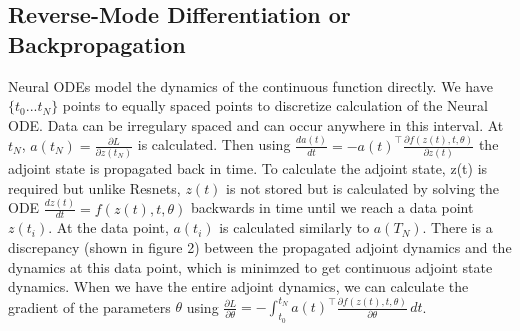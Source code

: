 \documentclass[12pt]{article}
\begin{document}
\subsection{Reverse-Mode Differentiation or Backpropagation} 
Neural ODEs model the dynamics of the continuous function directly. We have $\{t_{0} ... t_{N}\}$ points to equally spaced points to discretize calculation of the Neural ODE. Data can be irregulary spaced and can occur anywhere in this interval.
At $t_{N}$, \(a(t_N)= \frac{\partial L}{\partial z(t_N)}\) is calculated. Then using $\frac{da(t)}{dt} = -a(t)^\top \frac{\partial f(z(t), t, \theta)}{\partial z(t)}$ the adjoint state is propagated back in time.
To calculate the adjoint state, z(t) is required but unlike Resnets, $z(t)$ is not stored but is calculated by solving the ODE $\frac{dz(t)}{dt} = f(z(t), t, \theta)$ backwards in time until we reach a data point $z(t_i)$.
At the data point, $a(t_{i})$ is calculated similarly to $a(T_{N})$. There is a discrepancy (shown in figure 2) between the propagated adjoint dynamics and the dynamics at this data point, which is minimzed to get continuous adjoint state dynamics. 
When we have the entire adjoint dynamics, we can calculate the gradient of the parameters $\theta$ using $\frac{\partial L}{\partial \theta} = -\int_{t_0}^{t_N} a(t)^\top \frac{\partial f(z(t), t, \theta)}{\partial \theta} \, dt$. 
\end{document}
